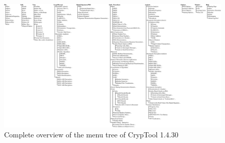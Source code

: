 \clearpage
\begin{figure}[hb]
\begin{center}
\vspace{-30pt}
\includegraphics[scale=0.25, angle=270]
                {figures/cryptool-menu-en}
\caption{Complete overview of the menu tree of CrypTool 1.4.30} 
\label{menuoverview}
\end{center}
\end{figure}
\clearpage
